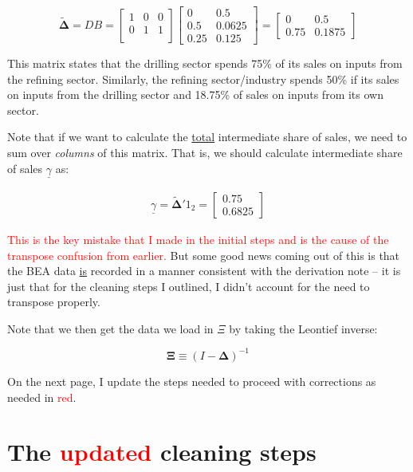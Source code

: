 \documentclass[12pt,english]{article}
\newcommand{\hlight}[1]{\textcolor{org}{#1}}
\newcommand{\rlight}[1]{\textcolor{red}{#1}}
\begin{document}
\hlight{$$
	\tilde{\mathbold{\Delta}} = DB = \begin{bmatrix}
		1 & 0 & 0\\
		0 & 1 & 1\\
	\end{bmatrix}\begin{bmatrix}
			0 & 0.5\\
		0.5 & 0.0625\\
		0.25 & 0.125
	\end{bmatrix} = \begin{bmatrix}
		0 & 0.5\\
		0.75 & 0.1875
	\end{bmatrix}
$$}

\hlight{This matrix states that the drilling sector spends 75\% of its sales on inputs from the refining sector. Similarly, the refining sector/industry spends 50\% if its sales on inputs from the drilling sector and 18.75\% of sales on inputs from its own sector.}

\hlight{Note that if we want to calculate the \underline{total} intermediate share of sales, we need to sum over \emph{columns} of this matrix. That is, we should calculate intermediate share of sales $\underline{\gamma}$ as:}

\hlight{\begin{align*}
	\underline{\gamma} = \tilde{\mathbold{\Delta}}' 1_2 = \begin{bmatrix}
		0.75\\ 0.6825
	\end{bmatrix}
\end{align*}}

\rlight{This is the key mistake that I made in the initial steps and is the cause of the transpose confusion from earlier.} \hlight{But some good news coming out of this is that the BEA data \underline{is} recorded in a manner consistent with the derivation note -- it is just that for the cleaning steps I outlined, I didn't account for the need to transpose properly.}

\hlight{Note that we then get the data we load in $\Xi$ by taking the Leontief inverse:}

\hlight{$$
	\mathbold{\Xi} \equiv (I-\mathbold{\Delta})^{-1}
$$}

\hlight{On the next page, I update the steps needed to proceed with corrections as needed in \rlight{red}.}


\newpage
\section*{The \rlight{updated} cleaning steps}
\end{document}
